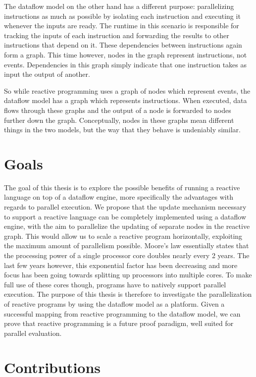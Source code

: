 The dataflow model on the other hand has a different purpose: parallelizing instructions as much as possible by isolating each instruction and executing it whenever the inputs are ready. The runtime in this scenario is responsible for tracking the inputs of each instruction and forwarding the results to other instructions that depend on it. These dependencies between instructions again form a graph. This time however, nodes in the graph represent instructions, not events. Dependencies in this graph simply indicate that one instruction takes as input the output of another. 

So while reactive programming uses a graph of nodes which represent events, the dataflow model has a graph which represents instructions. When executed, data flows through these graphs and the output of a node is forwarded to nodes further down the graph. Conceptually, nodes in these graphs mean different things in the two models, but the way that they behave is undeniably similar.

\section{Goals}

The goal of this thesis is to explore the possible benefits of running a reactive language on top of a dataflow engine, more specifically the advantages with regards to parallel execution. We propose that the update mechanism necessary to support a reactive language can be completely implemented using a dataflow engine, with the aim to parallelize the updating of separate nodes in the reactive graph. 
This would allow us to scale a reactive program horizontally, exploiting the maximum amount of parallelism possible. Moore's law essentially states that the processing power of a single processor core doubles nearly every 2 years. The last few years however, this exponential factor has been decreasing and more focus has been going towards splitting up processors into multiple cores. To make full use of these cores though, programs have to natively support parallel execution. The purpose of this thesis is therefore to investigate the parallelization of reactive programs by using the dataflow model as a platform. Given a successful mapping from reactive programming to the dataflow model, we can prove that reactive programming is a future proof paradigm, well suited for parallel evaluation. 

\section{Contributions}

